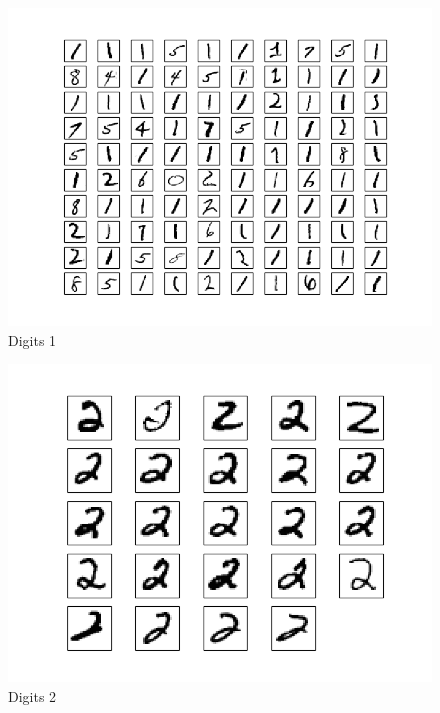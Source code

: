 \documentclass[10pt]{article}
\begin{document}
\begin{figure}
\begin{center}
\includegraphics[scale=0.5]{meansB1}
\caption{Digits 1}
\end{center}
\end{figure}
\begin{figure}
\begin{center}
\includegraphics[scale=0.5]{meansB2}
\caption{Digits 2}
\end{center}
\end{figure}
\end{document}
